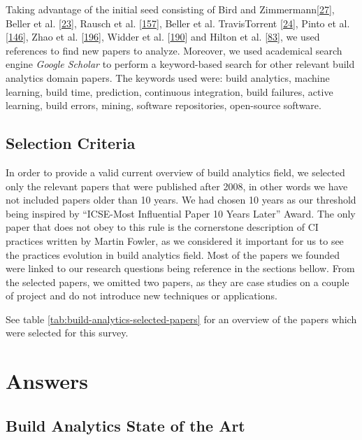 \documentclass[]{book}
\begin{document}
Taking advantage of the initial seed consisting of Bird and
Zimmermann{[}\protect\hyperlink{ref-bird2017predicting}{27}{]}, Beller
et al. {[}\protect\hyperlink{ref-beller2017oops}{23}{]}, Rausch et al.
{[}\protect\hyperlink{ref-rausch2017empirical}{157}{]}, Beller et al.
TravisTorrent {[}\protect\hyperlink{ref-beller2017travistorrent}{24}{]},
Pinto et al. {[}\protect\hyperlink{ref-pinto2018work}{146}{]}, Zhao et
al. {[}\protect\hyperlink{ref-zhao2017impact}{196}{]}, Widder et al.
{[}\protect\hyperlink{ref-widder2018m}{190}{]} and Hilton et al.
{[}\protect\hyperlink{ref-hilton2016usage}{83}{]}, we used references to
find new papers to analyze. Moreover, we used academical search engine
\emph{Google Scholar} to perform a keyword-based search for other
relevant build analytics domain papers. The keywords used were: build
analytics, machine learning, build time, prediction, continuous
integration, build failures, active learning, build errors, mining,
software repositories, open-source software.

\subsection{Selection Criteria}\label{selection-criteria}

In order to provide a valid current overview of build analytics field,
we selected only the relevant papers that were published after 2008, in
other words we have not included papers older than 10 years. We had
chosen 10 years as our threshold being inspired by ``ICSE-Most
Influential Paper 10 Years Later'' Award. The only paper that does not
obey to this rule is the cornerstone description of CI practices written
by Martin Fowler, as we considered it important for us to see the
practices evolution in build analytics field. Most of the papers we
founded were linked to our research questions being reference in the
sections bellow. From the selected papers, we omitted two papers, as
they are case studies on a couple of project and do not introduce new
techniques or applications.

See table \ref{tab:build-analytics-selected-papers} for an overview of
the papers which were selected for this survey.

\section{Answers}\label{answers}

\subsection{Build Analytics State of the
Art}\label{build-analytics-state-of-the-art}
\end{document}
